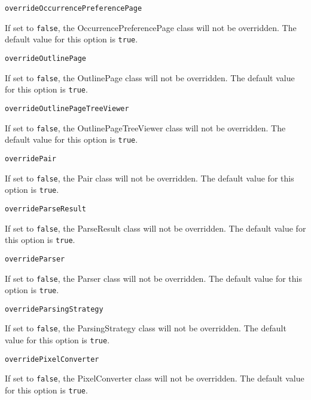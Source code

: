\noindent\texttt{overrideOccurrencePreferencePage}
\begin{myindentpar}{1cm}
If set to \texttt{false}, the OccurrencePreferencePage class will not be overridden. The default value for this option is \texttt{true}.
\end{myindentpar}

\noindent\texttt{overrideOutlinePage}
\begin{myindentpar}{1cm}
If set to \texttt{false}, the OutlinePage class will not be overridden. The default value for this option is \texttt{true}.
\end{myindentpar}

\noindent\texttt{overrideOutlinePageTreeViewer}
\begin{myindentpar}{1cm}
If set to \texttt{false}, the OutlinePageTreeViewer class will not be overridden. The default value for this option is \texttt{true}.
\end{myindentpar}

\noindent\texttt{overridePair}
\begin{myindentpar}{1cm}
If set to \texttt{false}, the Pair class will not be overridden. The default value for this option is \texttt{true}.
\end{myindentpar}

\noindent\texttt{overrideParseResult}
\begin{myindentpar}{1cm}
If set to \texttt{false}, the ParseResult class will not be overridden. The default value for this option is \texttt{true}.
\end{myindentpar}

\noindent\texttt{overrideParser}
\begin{myindentpar}{1cm}
If set to \texttt{false}, the Parser class will not be overridden. The default value for this option is \texttt{true}.
\end{myindentpar}

\noindent\texttt{overrideParsingStrategy}
\begin{myindentpar}{1cm}
If set to \texttt{false}, the ParsingStrategy class will not be overridden. The default value for this option is \texttt{true}.
\end{myindentpar}

\noindent\texttt{overridePixelConverter}
\begin{myindentpar}{1cm}
If set to \texttt{false}, the PixelConverter class will not be overridden. The default value for this option is \texttt{true}.
\end{myindentpar}

